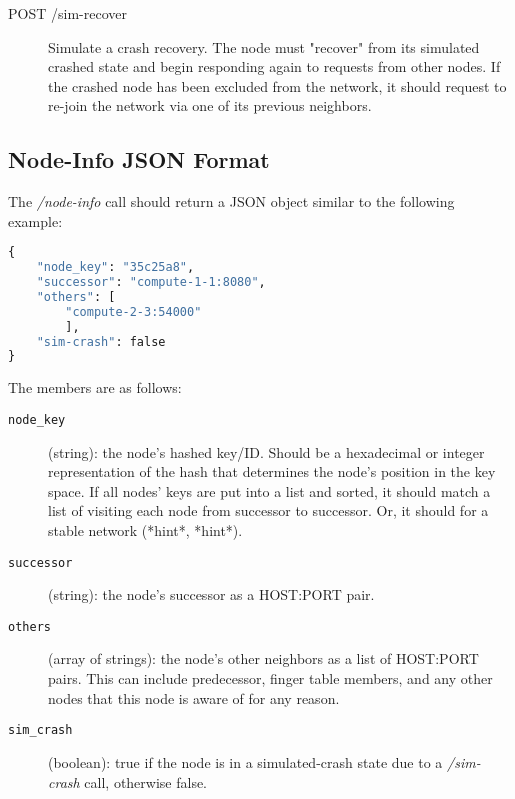 \documentclass[]{article}
\begin{document}
\begin{description}

    \item[POST /sim-recover]

        Simulate a crash recovery.
        The node must "recover" from its simulated crashed state and begin
        responding again to requests from other nodes.
        If the crashed node has been excluded from the network,
        it should request to re-join the network via one of its previous neighbors.

\end{description}

\subsection{Node-Info JSON Format}
\label{node_info_json_format}

The \textit{/node-info} call should return a JSON object similar to the following example:

\begin{lstlisting}[language=Python]
{
    "node_key": "35c25a8",
    "successor": "compute-1-1:8080",
    "others": [
        "compute-2-3:54000"
        ],
    "sim-crash": false
}
\end{lstlisting}

The members are as follows:

\begin{description}


    \item[\texttt{node\_key}] (string): the node's hashed key/ID.
        Should be a hexadecimal or integer representation of the hash
        that determines the node's position in the key space.
        If all nodes' keys are put into a list and sorted,
        it should match a list of visiting each node from successor to successor.
        Or, it should for a stable network {(*hint*, *hint*)}.

    \item[\texttt{successor}] (string): the node's successor as a HOST:PORT pair.

    \item[\texttt{others}] (array of strings): the node's other neighbors as a list of HOST:PORT pairs.
        This can include predecessor, finger table members, and any other
        nodes that this node is aware of for any reason.

    \item[\texttt{sim\_crash}] (boolean): true if the node is in a simulated-crash state
        due to a \textit{/sim-crash} call,
        otherwise false.

\end{description}
\end{document}
